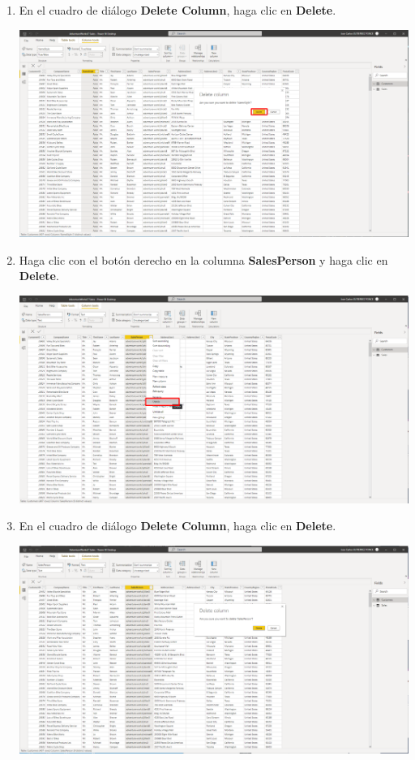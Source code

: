 \documentclass[12pt,letterpaper]{article}
\newcommand\tab[1][1cm]{\hspace*{#1}}
\begin{document}
\begin{enumerate}[\tab 1.]
\begin{center}
        \end{center}
        \item En el cuadro de diálogo \textbf{Delete Column}, haga clic en \textbf{Delete}.
        \begin{center}
            \includegraphics[width=13cm]{./img/img20.png}
        \end{center}
        \item Haga clic con el botón derecho en la columna \textbf{SalesPerson} y haga clic en \textbf{Delete}.
        \begin{center}
            \includegraphics[width=13cm]{./img/img21.png}
        \end{center}
        \item En el cuadro de diálogo \textbf{Delete Column}, haga clic en \textbf{Delete}.
        \begin{center}
            \includegraphics[width=13cm]{./img/img22.png}

\end{center}
\end{enumerate}
\end{document}
